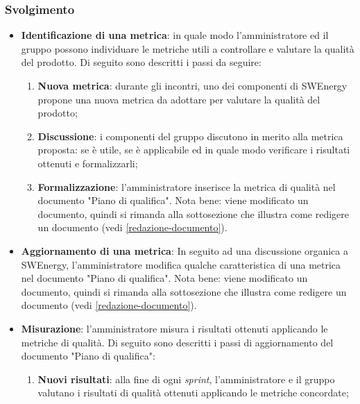 \subsubsection{Svolgimento}
\begin{itemize}
	\item \textbf{Identificazione di una metrica}: in quale modo
	      l'amministratore ed il gruppo possono individuare le metriche utili a
	      controllare e valutare la qualità del prodotto. Di seguito sono
	      descritti i passi da seguire:
	      \begin{enumerate}
		      \item \textbf{Nuova metrica}: durante gli incontri, uno dei
		            componenti di SWEnergy propone una nuova metrica da adottare
		            per valutare la qualità del prodotto;

		      \item \textbf{Discussione}: i componenti del gruppo discutono in
		            merito alla metrica proposta: se è utile, se è applicabile
		            ed in quale modo verificare i risultati ottenuti e
		            formalizzarli;

		      \item \textbf{Formalizzazione}: l'amministratore inserisce la
		            metrica di qualità nel documento "Piano di qualifica". Nota
		            bene: viene modificato un documento, quindi si rimanda alla
		            sottosezione che illustra come redigere un documento
		            (vedi \cref{redazione-documento}).
	      \end{enumerate}

	\item \textbf{Aggiornamento di una metrica}: In seguito ad una discussione
	      organica a SWEnergy, l'amministratore modifica qualche caratteristica
	      di una metrica nel documento "Piano di qualifica". Nota bene:
	      viene modificato un documento, quindi si rimanda alla
	      sottosezione che illustra come redigere un documento
	      (vedi \cref{redazione-documento}).

	\item \textbf{Misurazione}: l'amministratore misura i risultati ottenuti
	      applicando le metriche di qualità. Di seguito sono descritti i passi
	      di aggiornamento del documento "Piano di qualifica":
	      \begin{enumerate}
		      \item \textbf{Nuovi risultati}: alla fine di ogni \textit{sprint},
		            l'amministratore e il gruppo valutano i risultati di qualità
		            ottenuti applicando le metriche concordate;


\end{enumerate}
\end{itemize}
